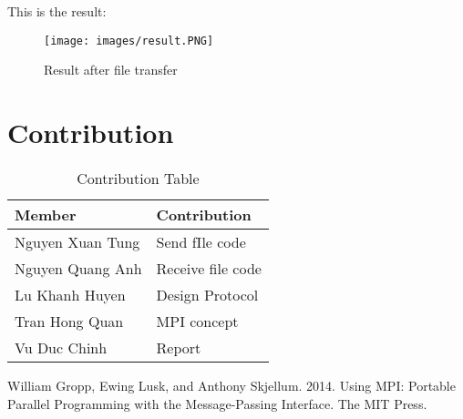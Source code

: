 \documentclass[13pt]{article}
\begin{document}
\noindent%
This is the result:
\begin{figure}[H]
    \centering
    \texttt{[image: images/result.PNG]}
    \caption{Result after file transfer}
\end{figure}


\section{Contribution}
\begin{table}[ht!]
  \begin{center}
    \begin{tabular}{|l|l|}
      \hline
      \textbf{Member} & \textbf{Contribution}\\
      \hline
      Nguyen Xuan Tung & Send fIle code\\
      \hline
      Nguyen Quang Anh & Receive file code\\
      \hline
      Lu Khanh Huyen & Design Protocol\\
      \hline
      Tran Hong Quan & MPI concept\\
      \hline
      Vu Duc Chinh & Report\\
      \hline
    \end{tabular}
    \caption{Contribution Table}
  \end{center}
\end{table}

\begin{thebibliography}{9}
William Gropp, Ewing Lusk, and Anthony Skjellum. 2014. Using MPI: Portable Parallel Programming with the Message-Passing Interface. The MIT Press.
\end{thebibliography}
\end{document}
